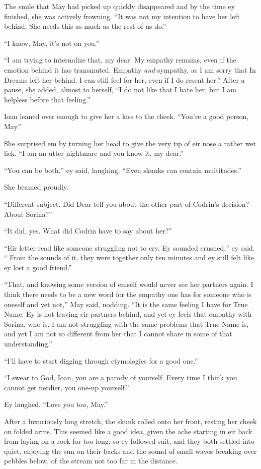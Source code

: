 The smile that May had picked up quickly disappeared and by the time ey finished, she was actively frowning. ``It was not my intention to have her left behind. She needs this as much as the rest of us do.''

``I know, May, it's not on you.''

``I am trying to internalize that, my dear. My empathy remains, even if the emotion behind it has transmuted. Empathy \emph{and} sympathy, as I am sorry that In Dreams left her behind. I can still feel for her, even if I do resent her.'' After a pause, she added, almost to herself, ``I do not like that I hate her, but I am helpless before that feeling.''

Ioan leaned over enough to give her a kiss to the cheek. ``You're a good person, May.''

She surprised em by turning her head to give the very tip of eir nose a rather wet lick. ``I am an utter nightmare and you know it, my dear.''

``You can be both,'' ey said, laughing. ``Even skunks can contain multitudes.''

She beamed proudly.

``Different subject. Did Dear tell you about the other part of Codrin's decision? About Sorina?''

``It did, yes. What did Codrin have to say about her?''

``Eir letter read like someone struggling not to cry. Ey sounded crushed,'' ey said. `` From the sounds of it, they were together only ten minutes and ey still felt like ey lost a good friend.''

``That, and knowing some version of emself would never see her partners again. I think there needs to be a new word for the empathy one has for someone who is oneself and yet not,'' May said, nodding. ``It is the same feeling I have for True Name. Ey is not leaving eir partners behind, and yet ey feels that empathy with Sorina, who is. I am not struggling with the same problems that True Name is, and yet I am not so different from her that I cannot share in some of that understanding.''

``I'll have to start digging through etymologies for a good one.''

``I swear to God, Ioan, you are a parody of yourself. Every time I think you cannot get nerdier, you one-up yourself.''

Ey laughed. ``Love you too, May.''

After a luxuriously long stretch, the skunk rolled onto her front, resting her cheek on folded arms. This seemed like a good idea, given the ache starting in eir back from laying on a rock for too long, so ey followed suit, and they both settled into quiet, enjoying the sun on their backs and the sound of small waves breaking over pebbles below, of the stream not too far in the distance.

